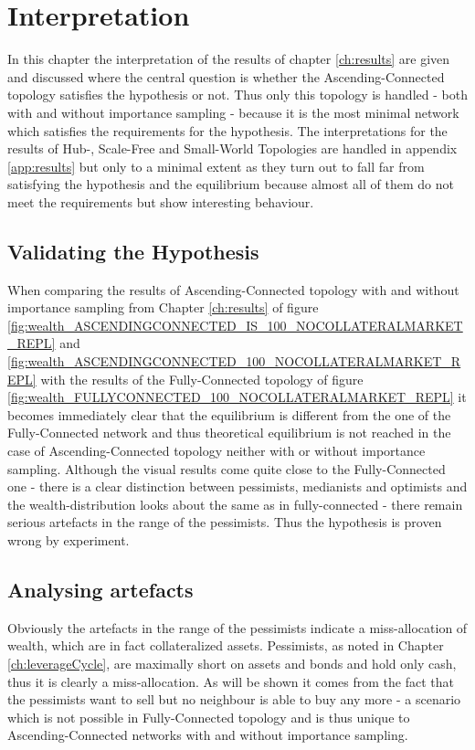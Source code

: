 \documentclass[Bachelorarbeit.tex]{subfiles}
\begin{document}
\graphicspath{{./figures/interpretation/}}	%

\chapter{Interpretation}
\label{ch:interpretation}

In this chapter the interpretation of the results of chapter \ref{ch:results} are given and discussed where the central question is whether the Ascending-Connected topology satisfies the hypothesis or not. Thus only this topology is handled - both with and without importance sampling - because it is the most minimal network which satisfies the requirements for the hypothesis. The interpretations for the results of Hub-, Scale-Free and Small-World Topologies are handled in appendix \ref{app:results} but only to a minimal extent as they turn out to fall far from satisfying the hypothesis and the equilibrium because almost all of them do not meet the requirements but show interesting behaviour.

\section{Validating the Hypothesis}
When comparing the results of Ascending-Connected topology with and without importance sampling from Chapter \ref{ch:results} of figure \ref{fig:wealth_ASCENDINGCONNECTED_IS_100_NOCOLLATERALMARKET_REPL} and \ref{fig:wealth_ASCENDINGCONNECTED_100_NOCOLLATERALMARKET_REPL} with the results of the Fully-Connected topology of figure \ref{fig:wealth_FULLYCONNECTED_100_NOCOLLATERALMARKET_REPL} it becomes immediately clear that the equilibrium is different from the one of the Fully-Connected network and thus theoretical equilibrium is not reached in the case of Ascending-Connected topology neither with or without importance sampling. Although the visual results come quite close to the Fully-Connected one - there is a clear distinction between pessimists, medianists and optimists and the wealth-distribution looks about the same as in fully-connected - there remain serious artefacts in the range of the pessimists. Thus the hypothesis is proven wrong by experiment.

\section{Analysing artefacts}
Obviously the artefacts in the range of the pessimists indicate a miss-allocation of wealth, which are in fact collateralized assets. Pessimists, as noted in Chapter \ref{ch:leverageCycle}, are maximally short on assets and bonds and hold only cash, thus it is clearly a miss-allocation. As will be shown it comes from the fact that the pessimists want to sell but no neighbour is able to buy any more - a scenario which is not possible in Fully-Connected topology and is thus unique to Ascending-Connected networks with and without importance sampling.
\end{document}
